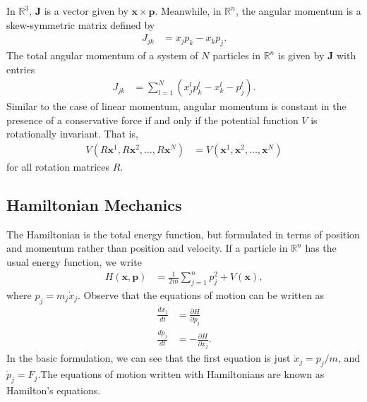 \documentclass[12pt]{extarticle}
\newcommand{\R}{\mathbb{R}}
\theoremstyle{plain}
\theoremstyle{definition}
\theoremstyle{remark}
\begin{document}
  In $\R^3$, $\mathbf{J}$ is a vector given by $\mathbf{x}\times \mathbf{p}$. Meanwhile, in $\R^n$, the angular momentum is a skew-symmetric matrix defined by
  \begin{align*}
    J_{jk} &= x_{j}p_k - x_kp_j.
  \end{align*}
  The total angular momentum of a system of $N$ particles in $\R^n$ is given by $\mathbf{J}$ with entries
  \begin{align*}
    J_{jk} &= \sum_{l=1}^{N}\left(x_{j}^lp_{k}^l - x_{k}^l - p_{j}^l\right).
  \end{align*}
  Similar to the case of linear momentum, angular momentum is constant in the presence of a conservative force if and only if the potential function $V$ is rotationally invariant. That is,
  \begin{align*}
    V(R\mathbf{x}^1,R\mathbf{x}^2,\dots,R\mathbf{x}^N) &= V(\mathbf{x}^1,\mathbf{x}^2,\dots,\mathbf{x}^N)
  \end{align*}
  for all rotation matrices $R$.
  \subsection{Hamiltonian Mechanics}%
  The Hamiltonian is the total energy function, but formulated in terms of position and momentum rather than position and velocity. If a particle in $\R^n$ has the usual energy function, we write
  \begin{align*}
    H(\mathbf{x},\mathbf{p}) &= \frac{1}{2m}\sum_{j=1}^{n}p_j^2 + V(\mathbf{x}),
  \end{align*}
  where $p_j = m_j\dot{x}_j$. Observe that the equations of motion can be written as
  \begin{align*}
    \frac{dx_j}{dt} &= \frac{\partial H}{\partial p_j}\\
    \frac{dp_j}{dt} &= -\frac{\partial H}{\partial x_j}.
  \end{align*}
  In the basic formulation, we can see that the first equation is just $\dot{x}_j = p_j/m$, and $\dot{p}_j = F_j$.The equations of motion written with Hamiltonians are known as Hamilton's equations.
\end{document}
